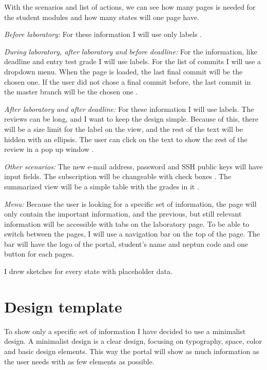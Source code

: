 With the scenarios and list of actions, we can see how many pages is needed for the student modules and how many states will one page have. 

\emph{Before laboratory:} For these information I will use only labels .

\emph{During laboratory, after laboratory and before deadline:} For the information, like deadline and entry test grade I will use labels. For the list of commits I will use a dropdown menu. When the page is loaded, the last final commit will be the chosen one. If the user did not chose a final commit before, the last commit in the master branch will be the chosen one .

\emph{After laboratory and after deadline:} For these information I will use labels. The reviews can be long, and I want to keep the design simple. Because of this, there will be a size limit for the label on the view, and the rest of the text will be hidden with an ellipsis. The user can click on the text to show the rest of the review in a pop up window .

\emph{Other scenarios:} The new e-mail address, password and SSH public keys will have input fields. The subscription will be changeable with check boxes . The summarized view will be a simple table with the grades in it .

\emph{Menu:} Because the user is looking for a specific set of information, the page will only contain the important information, and the previous, but still relevant information will be accessible with tabs on the laboratory page. To be able to switch between the pages, I will use a navigation bar on the top of the page. The bar will have the logo of the portal, student's name and neptun code and one button for each pages.

I drew sketches  for every state with placeholder data. 

\section{Design template}

To show only a specific set of information I have decided to use a minimalist design. A minimalist design is a clear design, focusing on typography, space, color and basic design elements. This way the portal will show as much information as the user needs with as few elements as possible. 


